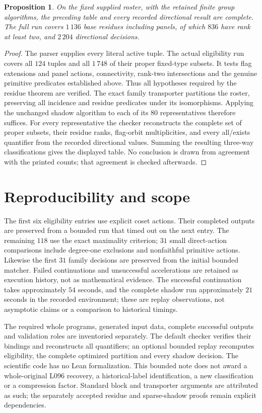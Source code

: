 \documentclass[11pt]{article}
\newtheorem{proposition}{Proposition}
\begin{document}
\begin{proposition}
On the fixed supplied roster, with the retained finite group algorithms,
the preceding table and every recorded directional result are complete.
The full run covers $1\,136$ base residues including panels, of which
$836$ have rank at least two, and $2\,204$ directional decisions.
\end{proposition}
\begin{proof}
The parser supplies every literal active tuple. The actual eligibility
run covers all $124$ tuples and all $1\,748$ of their proper fixed-type
subsets. It tests flag extensions and panel actions, connectivity,
rank-two intersections and the genuine primitive predicates established
above. Thus all hypotheses required by the residue theorem are verified.
The exact family transporter partitions the roster, preserving all
incidence and residue predicates under its isomorphisms. Applying the
unchanged shadow algorithm to each of its $80$ representatives therefore
suffices. For every representative the checker reconstructs the complete
set of proper subsets, their residue ranks, flag-orbit multiplicities,
and every all/exists quantifier from the recorded directional values.
Summing the resulting three-way classifications gives the displayed
table. No conclusion is drawn from agreement with the printed counts;
that agreement is checked afterwards.
\end{proof}

\section{Reproducibility and scope}
The first six eligibility entries use explicit coset actions. Their
completed outputs are preserved from a bounded run that timed out on
the next entry. The remaining $118$ use the exact maximality criterion;
$31$ small direct-action comparisons include degree-one exclusions and
nonfaithful primitive actions. Likewise the first $31$ family decisions
are preserved from the initial bounded matcher. Failed continuations and
unsuccessful accelerations are retained as execution history, not as
mathematical evidence. The successful continuation takes approximately
$54$ seconds, and the complete shadow run approximately $21$ seconds in
the recorded environment; these are replay observations, not asymptotic
claims or a comparison to historical timings.

The required whole programs, generated input data, complete successful
outputs and validation roles are inventoried separately. The default
checker verifies their bindings and reconstructs all quantifiers; an
optional bounded replay recomputes eligibility, the complete optimized
partition and every shadow decision. The scientific code has no Lean
formalization. This bounded note does not award a whole-original L096
recovery, a historical-label identification, a new classification or a
compression factor. Standard block and transporter arguments are
attributed as such; the separately accepted residue and sparse-shadow
proofs remain explicit dependencies.
\end{document}

